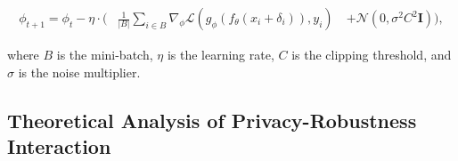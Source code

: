 \documentclass[11pt, conference]{IEEEtran}
\begin{document}
\begin{equation}
\begin{split}
\phi_{t+1} = \phi_t - \eta \cdot \Bigg(&\frac{1}{|B|} \sum_{i \in B} \nabla_{\phi} \mathcal{L}(g_{\phi}(f_{\theta}(x_i + \delta_i)), y_i) \
&+ \mathcal{N}(0, \sigma^2 C^2 \mathbf{I})\Bigg),
\end{split}
\end{equation}



where $B$ is the mini-batch, $\eta$ is the learning rate, $C$ is the clipping threshold, and $\sigma$ is the noise multiplier.




    




\subsection{Theoretical Analysis of Privacy-Robustness Interaction}
\end{document}
